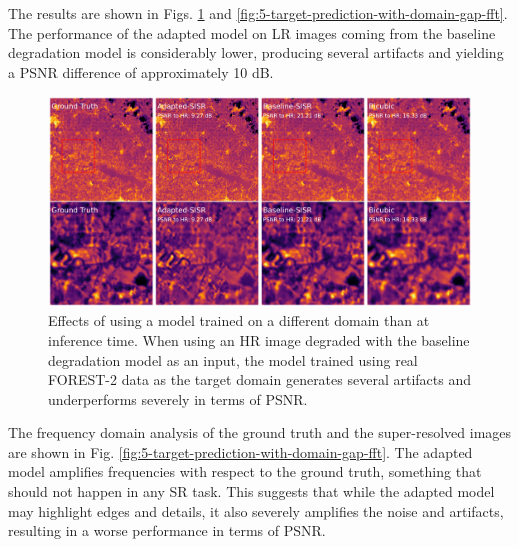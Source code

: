         The results are shown in Figs. \ref{fig:5-target-prediction-with-domain-gap} and \ref{fig:5-target-prediction-with-domain-gap-fft}.
        The performance of the adapted model on LR images coming from the baseline degradation model is considerably lower, producing several artifacts and yielding a PSNR difference of approximately 10 dB.

        \begin{figure}[H]
            \centering
            \includegraphics[scale=0.28]{Includes/5-target_prediction_sample-with-domain-gap.pdf}
            \caption{Effects of using a model trained on a different domain than at inference time. 
                     When using an HR image degraded with the baseline degradation model as an input, the model trained using real FOREST-2 data as the target domain generates several artifacts and underperforms severely in terms of PSNR. }
            \label{fig:5-target-prediction-with-domain-gap}
        \end{figure}

        The frequency domain analysis of the ground truth and the super-resolved images are shown in Fig. \ref{fig:5-target-prediction-with-domain-gap-fft}.  
        The adapted model amplifies frequencies with respect to the ground truth, something that should not happen in any SR task. 
        This suggests that while the adapted model may highlight edges and details, it also severely amplifies the noise and artifacts, resulting in a worse performance in terms of PSNR.
        

